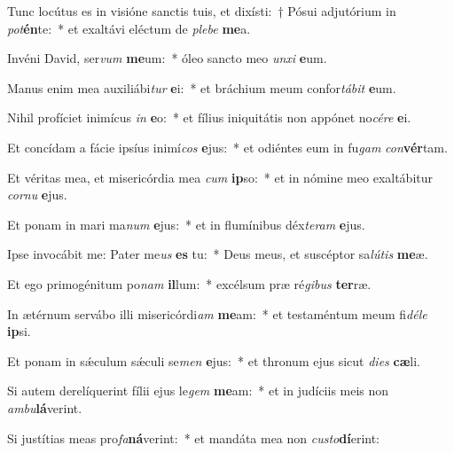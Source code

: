 \item Tunc locútus es in visióne sanctis tuis, et dixísti:~† Pósui adjutórium in \textit{pot}\textbf{én}te:~* et exaltávi eléctum de \textit{ple}\textit{be} \textbf{me}a.

\item Invéni David, ser\textit{vum} \textbf{me}um:~* óleo sancto meo \textit{un}\textit{xi} \textbf{e}um.

\item Manus enim mea auxiliábi\textit{tur} \textbf{e}i:~* et bráchium meum confor\textit{tá}\textit{bit} \textbf{e}um.

\item Nihil profíciet inimícus \textit{in} \textbf{e}o:~* et fílius iniquitátis non appónet no\textit{cé}\textit{re} \textbf{e}i.

\item Et concídam a fácie ipsíus inimí\textit{cos} \textbf{e}jus:~* et odiéntes eum in fu\textit{gam} \textit{con}\textbf{vér}tam.

\item Et véritas mea, et misericórdia mea \textit{cum} \textbf{ip}so:~* et in nómine meo exaltábitur \textit{cor}\textit{nu} \textbf{e}jus.

\item Et ponam in mari ma\textit{num} \textbf{e}jus:~* et in flumínibus déx\textit{te}\textit{ram} \textbf{e}jus.

\item Ipse invocábit me: Pater me\textit{us} \textbf{es} tu:~* Deus meus, et suscéptor sa\textit{lú}\textit{tis} \textbf{me}æ.

\item Et ego primogénitum po\textit{nam} \textbf{il}lum:~* excélsum præ ré\textit{gi}\textit{bus} \textbf{ter}ræ.

\item In ætérnum servábo illi misericórdi\textit{am} \textbf{me}am:~* et testaméntum meum fi\textit{dé}\textit{le} \textbf{ip}si.

\item Et ponam in sǽculum sǽculi se\textit{men} \textbf{e}jus:~* et thronum ejus sicut \textit{di}\textit{es} \textbf{cæ}li.

\item Si autem derelíquerint fílii ejus le\textit{gem} \textbf{me}am:~* et in judíciis meis non \textit{am}\textit{bu}\textbf{lá}verint.

\item Si justítias meas pro\textit{fa}\textbf{ná}verint:~* et mandáta mea non \textit{cus}\textit{to}\textbf{dí}erint:

